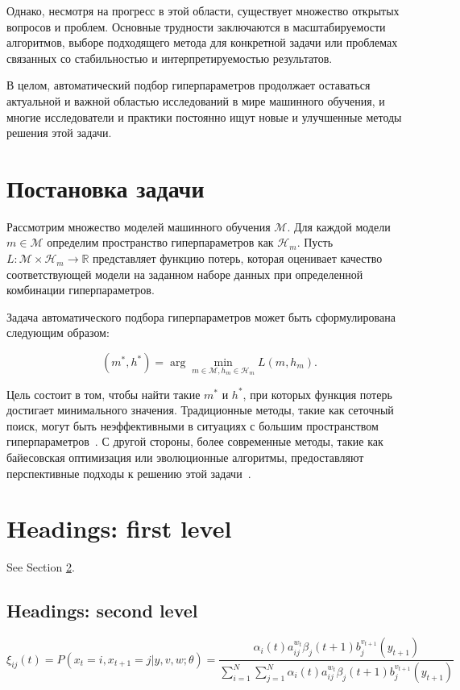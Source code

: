 \documentclass{article}
\begin{document}
Однако, несмотря на прогресс в этой области, существует множество открытых вопросов и проблем. Основные трудности заключаются в масштабируемости алгоритмов, выборе подходящего метода для конкретной задачи или проблемах связанных со стабильностью и интерпретируемостью результатов.

В целом, автоматический подбор гиперпараметров продолжает оставаться актуальной и важной областью исследований в мире машинного обучения, и многие исследователи и практики постоянно ищут новые и улучшенные методы решения этой задачи.

\section{Постановка задачи}
Рассмотрим множество моделей машинного обучения \( \mathcal{M} \). Для каждой модели \( m \in \mathcal{M} \) определим пространство гиперпараметров как \( \mathcal{H}_m \). Пусть \( L: \mathcal{M} \times \mathcal{H}_m \rightarrow \mathbb{R} \) представляет функцию потерь, которая оценивает качество соответствующей модели на заданном наборе данных при определенной комбинации гиперпараметров.

Задача автоматического подбора гиперпараметров может быть сформулирована следующим образом:

\[
(m^*, h^*) = \arg\min_{m \in \mathcal{M}, h_m \in \mathcal{H}_m} L(m, h_m).
\]

Цель состоит в том, чтобы найти такие \( m^* \) и \( h^* \), при которых функция потерь достигает минимального значения. Традиционные методы, такие как сеточный поиск, могут быть неэффективными в ситуациях с большим пространством гиперпараметров~\citep{bergstra2012}. С другой стороны, более современные методы, такие как байесовская оптимизация или эволюционные алгоритмы, предоставляют перспективные подходы к решению этой задачи~\citep{snoek2012, thornton2013}.



\section{Headings: first level}
\label{sec:headings}

\lipsum[4] See Section \ref{sec:headings}.

\subsection{Headings: second level}
\lipsum[5]
\begin{equation}
	\xi _{ij}(t)=P(x_{t}=i,x_{t+1}=j|y,v,w;\theta)= {\frac {\alpha _{i}(t)a^{w_t}_{ij}\beta _{j}(t+1)b^{v_{t+1}}_{j}(y_{t+1})}{\sum _{i=1}^{N} \sum _{j=1}^{N} \alpha _{i}(t)a^{w_t}_{ij}\beta _{j}(t+1)b^{v_{t+1}}_{j}(y_{t+1})}}
\end{equation}
\end{document}
